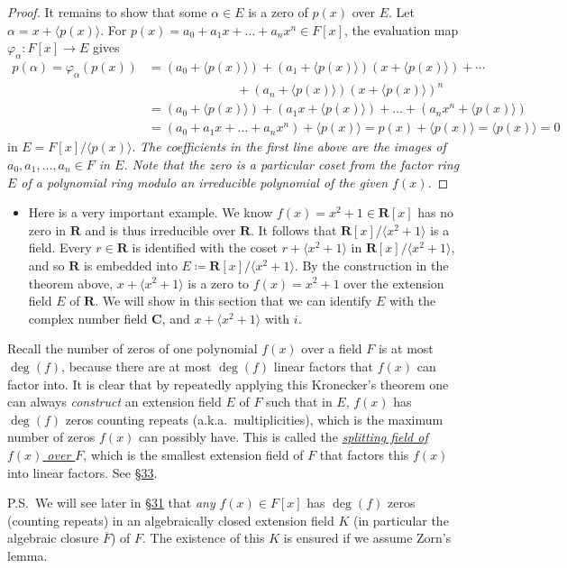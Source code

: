 \documentclass[11pt]{article}
\newcommand{\lk}[2]{\hyperlink{subsection.#1.#2}{\S#2}} %
\newcommand{\R}{\mathbf{R}}
\newcommand{\C}{\mathbf{C}}
\newcommand{\df}[1]{\ul{\textit{\textsf{#1}}}}
\newcommand{\la}{\langle}
\newcommand{\ra}{\rangle}
\newcommand{\gen}[1]{\langle #1 \rangle}
\newcommand{\clos}[1]{\overline{#1}}
\renewcommand{\phi}{\varphi}
\begin{document}
\begin{itemize}
\begin{proof}
        It remains to show that some $\alpha \in E$ is a zero of $p(x)$ over $E$. Let $\alpha = x + \gen{p(x)}$. For $p(x) = a_0 + a_1x + \dots + a_n x^n \in F[x]$, the evaluation map $\phi_\alpha: F[x] \to E$ gives 
        \begin{align*}
            p(\alpha) = \phi_\alpha(p(x)) & = (a_0 + \gen{p(x)}) + (a_1 + \gen{p(x)})(x + \gen{p(x)}) + \cdots \\ & \qquad \qquad \qquad \quad + (a_n + \gen{p(x)})(x+\gen{p(x)})^n \\ & = (a_0 + \gen{p(x)}) + (a_1x + \gen{p(x)}) + \dots + (a_nx^n + \gen{p(x)}) \\ & = (a_0 + a_1x + \dots + a_n x^n) + \gen{p(x)} = p(x) + \gen{p(x)} = \gen{p(x)} = 0
        \end{align*}
        in $E = F[x]/\gen{p(x)}$. \emph{The coefficients in the first line above are the images of $a_0,a_1,\dots,a_n \in F$ in $E$. Note that the zero is a particular coset from the factor ring $E$ of a polynomial ring modulo an irreducible polynomial of the given $f(x)$.}
    \end{proof}
    \begin{itemize}
        \item Here is a very important example. We know $f(x) = x^2 + 1 \in \R[x]$ has no zero in $\R$ and is thus irreducible over $\R$. It follows that $\R[x]/\la x^2 + 1 \ra$ is a field. Every $r \in \R$ is identified with the coset $r + \la x^2 + 1 \ra$ in $\R[x]/\la x^2+1 \ra$, and so $\R$ is embedded into $E \coloneqq \R[x]/\la x^2+1 \ra$. By the construction in the theorem above, $x + \la x^2+1 \ra$ is a zero to $f(x) = x^2 + 1$ over the extension field $E$ of $\R$. We will show in this section that we can identify $E$ with the complex number field $\C$, and $x + \la x^2+1 \ra$ with $i$.
    \end{itemize}
\end{itemize}
    \begin{framed}
    Recall the number of zeros of one polynomial $f(x)$ over a field $F$ is at most $\deg(f)$, because there are at most $\deg(f)$ linear factors that $f(x)$ can factor into. It is clear that by repeatedly applying this Kronecker's theorem one can always \emph{construct} an extension field $E$ of $F$ such that in $E$, $f(x)$ has $\deg(f)$ zeros counting repeats (a.k.a.\ multiplicities), which is the maximum number of zeros $f(x)$ can possibly have. This is called the \df{splitting field of $f(x)$ over $F$}, which is the smallest extension field of $F$ that factors this $f(x)$ into linear factors. See \lk{6}{33}.
    
    P.S.\ We will see later in \lk{6}{31} that \emph{any} $f(x) \in F[x]$ has $\deg(f)$ zeros (counting repeats) in an algebraically closed extension field $K$ (in particular the algebraic closure $\clos{F}$) of $F$. The existence of this $K$ is ensured if we assume Zorn's lemma.
    \end{framed}
\end{document}

